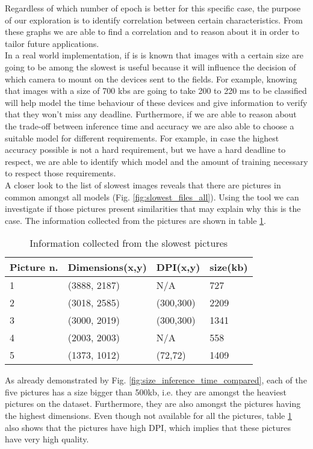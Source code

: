 Regardless of which number of epoch is better for this specific case, the purpose of our exploration is to identify correlation between certain characteristics. From these graphs we are able to find a correlation and to reason about it in order to tailor future applications. \\
In a real world implementation, if is is known that images with a certain size are going to be among the slowest is useful because it will influence the decision of which camera to mount on the devices sent to the fields. For example, knowing that images with a size of 700 kbs are going to take 200 to 220 ms to be classified will help model the time behaviour of these devices and give information to verify that they won't miss any deadline. Furthermore, if we are able to reason about the trade-off between inference time and accuracy we are also able to choose a suitable model for different requirements. For example, in case the highest accuracy possible is not a hard requirement, but we have a hard deadline to respect, we are able to identify which model and the amount of training necessary to respect those requirements. \\

A closer look to the list of slowest images reveals that there are pictures in common amongst all models (Fig. \ref{fig:slowest_files_all}). Using the tool we can investigate if those pictures present similarities that may explain why this is the case. The information collected from the pictures are shown in table 
\ref{tab:pictures_info}.

\begin{table}[htbp]
\centering
\begin{tabular}{ p{2cm} p{4cm}  p{2cm}  p{2cm}  }
 Picture n.& Dimensions(x,y) & DPI(x,y)&size(kb) \\
 \hline
1&(3888, 2187)&N/A& 727\\
2&(3018, 2585)&(300,300)&2209\\
3&(3000, 2019)&(300,300)&1341\\
4&(2003, 2003)&N/A&558\\
5&(1373, 1012)&(72,72)&1409\\
 \hline
\end{tabular}
\caption{Information collected from the slowest pictures}
\label{tab:pictures_info}
\end{table}

As already demonstrated by Fig. \ref{fig:size_inference_time_compared}, each of the five pictures has a size bigger than 500kb, i.e. they are amongst the heaviest pictures on the dataset. Furthermore, they are also amongst the pictures having the highest dimensions. Even though not available for all the pictures, table \ref{tab:pictures_info} also shows that the pictures have high DPI, which implies that these pictures have very high quality. 






